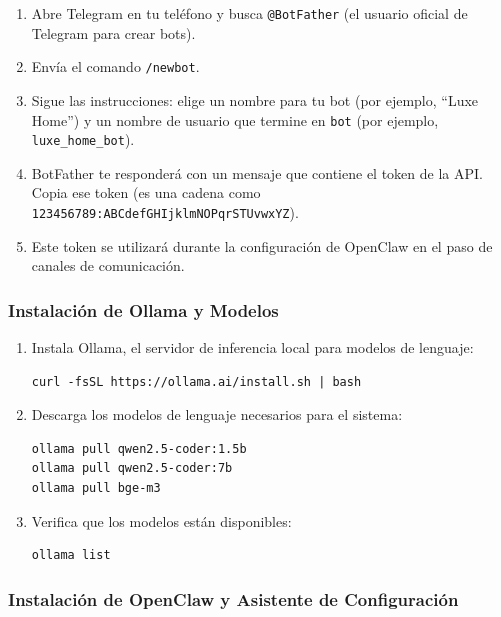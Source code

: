 \begin{enumerate}
    \item Abre Telegram en tu teléfono y busca \texttt{@BotFather} (el usuario oficial de Telegram para crear bots).
    \item Envía el comando \texttt{/newbot}.
    \item Sigue las instrucciones: elige un nombre para tu bot (por ejemplo, ``Luxe Home'') y un nombre de usuario que termine en \texttt{bot} (por ejemplo, \texttt{luxe\_home\_bot}).
    \item BotFather te responderá con un mensaje que contiene el token de la API. Copia ese token (es una cadena como \texttt{123456789:ABCdefGHIjklmNOPqrSTUvwxYZ}).
    \item Este token se utilizará durante la configuración de OpenClaw en el paso de canales de comunicación.
\end{enumerate}

\subsubsection*{Instalación de Ollama y Modelos}

\begin{enumerate}
    \item Instala Ollama, el servidor de inferencia local para modelos de lenguaje:
\begin{verbatim}
curl -fsSL https://ollama.ai/install.sh | bash
\end{verbatim}
    \item Descarga los modelos de lenguaje necesarios para el sistema:
\begin{verbatim}
ollama pull qwen2.5-coder:1.5b
ollama pull qwen2.5-coder:7b
ollama pull bge-m3
\end{verbatim}
    \item Verifica que los modelos están disponibles:
\begin{verbatim}
ollama list
\end{verbatim}
\end{enumerate}

\subsubsection*{Instalación de OpenClaw y Asistente de Configuración}

